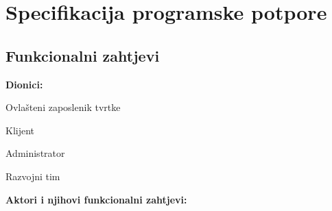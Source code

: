 \chapter{Specifikacija programske potpore}

\section{Funkcionalni zahtjevi}			

\noindent \textbf{Dionici:}

\begin{packed_enum}
	
	\item Ovlašteni zaposlenik tvrtke
	\item Klijent
	\item Administrator
	\item Razvojni tim
	
\end{packed_enum}

\noindent \textbf{Aktori i njihovi funkcionalni zahtjevi:}


